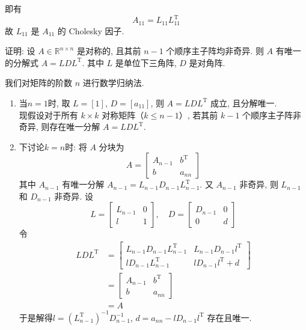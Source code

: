 \documentclass[12pt, answers]{exam}     %
\newcommand{\R}{\mathbb{R}}
\newcommand{\T}{\mathrm{T}}
\begin{document}
\begin{questions}
\begin{solution}
即有
\[
A_{11} = L_{11}L_{11}^{\T}
\]
故 \( L_{11} \) 是 \( A_{11} \) 的 Cholesky 因子.
\end{solution}

\question{}
证明: 设 \( A \in \R^{n \times n} \) 是对称的, 且其前 \( n-1 \) 个顺序主子阵均非奇异. 则 \( A \) 有唯一的分解式
\( A = LDL^{\T} \). 其中 \( L \) 是单位下三角阵, \( D \) 是对角阵. 

\begin{solution}
我们对矩阵的阶数 \( n \) 进行数学归纳法. 
\begin{enumerate}
\item 当$n = 1$时, 取 \( L = [1] \), \( D = [a_{11}] \), 则 \( A = LDL^{\T} \) 成立, 且分解唯一. 
\\ 现假设对于所有 \( k \times k \) 对称矩阵（\( k \leq n-1 \)）, 若其前 \( k-1 \) 个顺序主子阵非奇异, 则存在唯一分解 \( A = LDL^{\T} \).
\item 下讨论\( k = n \)时: 
将 \( A \) 分块为
\[
A = \begin{bmatrix}
    A_{n-1} & b^{\T} \\
    b & a_{nn}
\end{bmatrix}
\]
其中 \( A_{n-1} \) 有唯一分解 \( A_{n-1} = L_{n-1}D_{n-1}L_{n-1}^{\T} \). 
又 \( A_{n-1} \) 非奇异, 则 \( L_{n-1} \) 和 \( D_{n-1} \) 非奇异. 设
\[
L = \begin{bmatrix}
    L_{n-1} & 0 \\
    l & 1
\end{bmatrix}, \quad
D = \begin{bmatrix}
    D_{n-1} & 0 \\
    0 & d
\end{bmatrix}
\]
令
\begin{align*}
LDL^{\T} &= \begin{bmatrix}
    L_{n-1} D_{n-1} L_{n-1}^{\T} & L_{n-1} D_{n-1} l^{\T} \\
    l D_{n-1} L_{n-1}^{\T} & l D_{n-1} l^{\T} + d
\end{bmatrix} \\
&= \begin{bmatrix}
    A_{n-1} & b^{\T} \\
    b & a_{nn}
\end{bmatrix} \\
&= A
\end{align*}
于是解得\( l = (L_{n-1}^{\T})^{-1} D_{n-1}^{-1} \), \( d = a_{nn} - l D_{n-1} l^{\T} \) 存在且唯一.


\end{enumerate}
\end{solution}
\end{questions}
\end{document}
